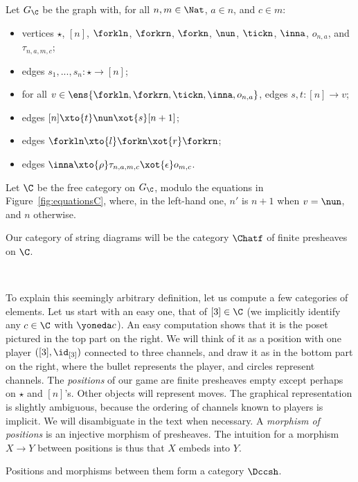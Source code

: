 \documentclass{LMCS}
\theoremstyle{plain}\newtheorem{satz}[thm]{Satz}
\begin{document}
\begin{defi}
Let $G_{\C}$ be the graph with, for all $n, m \in \Nat$, $a \in n$, and $c \in m$:
  \begin{itemize}
  \item vertices $\star$, $[n]$, $\forkln$, $\forkrn$, $\forkn$,
    $\nun$, $\tickn$, $\inna$, $o_{n,a}$, and $\tau_{n,a,m,c}$;
  \item edges $s_1,...,s_n : \star \to [n]$;
  \item for all $v \in \ens{\forkln,\forkrn,\tickn,\inna,o_{n,a }}$, edges
    $s,t : [n] \to v$;
  \item edges $[n] \xto{t} \nun \xot{s} [n+1]$;
  \item edges $\forkln \xto{l} \forkn \xot{r} \forkrn$;
  \item edges $\inna \xto{\rho} \tau_{n,a,m,c} \xot{\epsilon} o_{m,c}$.
  \end{itemize}

  Let $\C$ be the free category on $G_{\C}$, modulo the equations in
  Figure~\ref{fig:equationsC}, where, in the left-hand one, $n'$ is $n+1$
  when $v = \nun$, and $n$ otherwise.
\end{defi}
Our category of string diagrams will be the category $\Chatf$ of finite
presheaves on $\C$.


\begin{wrapfigure}{r}{0pt}
  \begin{minipage}[t]{0.3\linewidth}
    \centering
    \\
  \end{minipage}
\end{wrapfigure}
To explain this seemingly arbitrary definition, let us compute a few
categories of elements. Let us start with an easy one, that of $[3]
\in \C$ (we implicitly identify any $c \in \C$ with $\yoneda c$). An
easy computation shows that it is the poset pictured in the top part
on the right. We will think of it as a position with one player
$([3],\id_{[3]})$ connected to three channels, and draw it as in the
bottom part on the right, where the bullet represents the player, and
circles represent channels.  The \emph{positions} of our game are
finite presheaves empty except perhaps on $\star$ and $[n]$'s. Other
objects will represent moves.  The graphical representation is
slightly ambiguous, because the ordering of channels known to players
is implicit.  We will disambiguate in the text when necessary.  A
\emph{morphism of positions} is an injective morphism of presheaves.
The intuition for a morphism $X \to Y$ between positions is thus that
$X$ embeds into $Y$.
\begin{defi}\label{def:Dh}
  Positions and morphisms between them form a category $\Dccsh$.
\end{defi}
\end{document}
